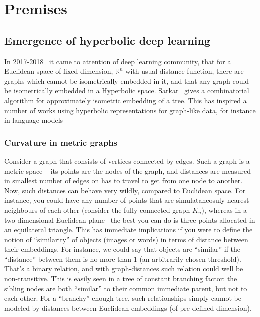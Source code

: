 %


\chapter{Premises} \label{chap:premises}

\section{Emergence of hyperbolic deep learning} \label{sec:history}

In 2017-2018~\cite{nickelKiela17} it came to attention of deep learning community, that for a
Euclidean space of fixed dimension, \( \mathbb{R}^n \) with usual distance
function, there are graphs which cannot be isometrically embedded in it, and
that any graph could be isometrically embedded in a Hyperbolic space.
Sarkar~\cite{sarkar} gives a combinatorial algorithm for approximately
isometric embedding of a tree. This has inspired a number of works using
hyperbolic representations for graph-like data, for instance in language models

\subsection*{Curvature in metric graphs}

Consider a graph that consists of vertices connected by edges. Such a graph is
a metric space -- its points are the nodes of the graph, and distances are
measured in smallest number of edges on has to travel to get from one node to
another.  Now, such distances can behave very wildly, compared to Euclidean
space. For instance, you could have any number of points that are
simulataneosuly nearest neighbours of each other (consider the fully-connected
graph \( K_n \)), whereas in a two-dimensional Euclidean
plane~\cite{howManyNeighbours} the best you can do is three points allocated in
an equilateral triangle. This has immediate implications if you were to define
the notion of ``similarity'' of objects (images or words) in terms of distance
between their embeddings.  For instance, we could say that objects are
``similar'' if the ``distance'' between them is no more than \( 1 \) (an
arbitrarily chosen threshold).  That's a binary relation, and with
graph-distances such relation could well be non-transitive. This is easily seen
in a tree of constant branching factor: the sibling nodes are both ``similar''
to their common immediate parent, but not to each other. For a ``branchy''
enough tree, such relationships simply cannot be modeled by distances between
Euclidean embeddings (of pre-defined dimension).

